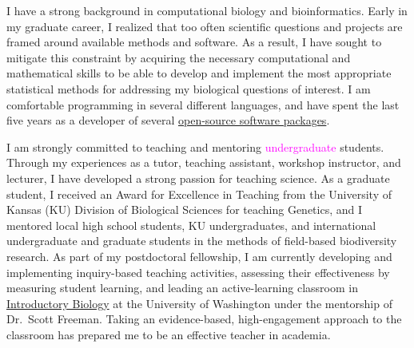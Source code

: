 \documentclass[letterpaper, 10pt]{letter}
\newcommand{\highlight}[1]{\textcolor{magenta}{#1}}
\begin{document}
\begin{letter}
I have a strong background in computational biology and bioinformatics.
Early in my graduate career, I realized that too often scientific questions and
projects are framed around available methods and software.
As a result, I have sought to mitigate this constraint by acquiring the
necessary computational and mathematical skills to be able to develop and
implement the most appropriate statistical methods for addressing my biological
questions of interest.
I am comfortable programming in several different languages, and have spent the
last five years as a developer of several
\href{http://www.phyletica.com/?page_id=249}{open-source software packages}.

I am strongly committed to teaching and mentoring
\highlight{
    undergraduate
}
students.
Through my experiences as a tutor, teaching assistant, workshop instructor,
and lecturer, I have developed a strong passion for teaching science.
As a graduate student, I received an Award for Excellence in Teaching from the
University of Kansas (KU) Division of Biological Sciences for teaching
Genetics, and I mentored local high school students, KU undergraduates, and
international undergraduate and graduate students in the methods of field-based
biodiversity research.
As part of my postdoctoral fellowship, I am currently developing and
implementing inquiry-based teaching activities, assessing their effectiveness
by measuring student learning, and leading an active-learning classroom in
\href{http://courses.biology.washington.edu/biol180/}{Introductory Biology} at
the University of Washington under the mentorship of Dr.\ Scott Freeman.
Taking an evidence-based, high-engagement approach to the classroom has
prepared me to be an effective teacher in academia.




\end{letter}
\end{document}
